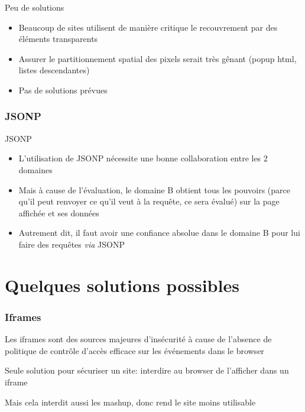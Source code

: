 \begin{reveals}
\begin{frame}
  \begin{block}{Peu de solutions}
    \begin{itemize}
    \item Beaucoup de sites utilisent de mani{\`e}re critique le
      recouvrement par des {\'e}l{\'e}ments transparents
    \item Assurer le partitionnement spatial des pixels serait tr{\`e}s
      g{\^e}nant (popup html, listes descendantes)
    \item Pas de solutions prévues
    \end{itemize}
  \end{block}
\end{frame}



\begin{frame}
  \frametitle{JSONP}

  \begin{block}{JSONP}
    \begin{itemize}
    \item L'utilisation de JSONP n{\'e}cessite une bonne collaboration
      entre les 2 domaines
    \item Mais {\`a} cause de l'{\'e}valuation, le domaine B obtient tous les
      pouvoirs (parce qu'il peut renvoyer ce qu'il veut {\`a} la requ{\^e}te,
      ce sera {\'e}valu{\'e}) sur la page affich{\'e}e et ses donn{\'e}es
    \item Autrement dit, il faut avoir une confiance absolue dans le
      domaine B pour lui faire des requ{\^e}tes \textit{via} JSONP
    \end{itemize}
  \end{block}


\end{frame}


\section{Quelques solutions possibles}


\begin{frame}
  \frametitle{Iframes}

  \begin{gitemize}
  \item Les iframes sont des sources majeures d'ins{\'e}curit{\'e} {\`a} cause de
    l'absence de politique de contr{\^o}le d'acc{\`e}s efficace sur les
    {\'e}v{\'e}nements dans le browser
  \item Seule solution pour s{\'e}curiser un site: interdire au browser de
    l'afficher dans un iframe
  \item Mais cela interdit aussi les mashup, donc rend le site moins
    utilisable
  \end{gitemize}


\end{frame}
\end{reveals}
